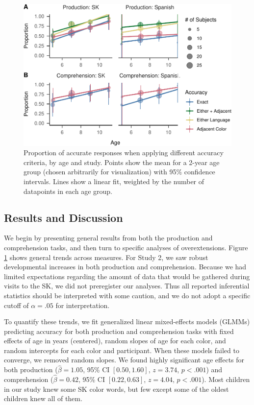 \documentclass[
  english,
  ,man,floatsintext]{apa6}
\begin{document}
\begin{figure}
\centering
\includegraphics{amazon_color_files/figure-latex/study23-accuracy-1.pdf}
\caption{\label{fig:study23-accuracy}Proportion of accurate responses when applying different accuracy criteria, by age and study. Points show the mean for a 2-year age group (chosen arbitrarily for visualization) with 95\% confidence intervals. Lines show a linear fit, weighted by the number of datapoints in each age group.}
\end{figure}

\hypertarget{results-and-discussion-1}{%
\subsection{Results and Discussion}\label{results-and-discussion-1}}

We begin by presenting general results from both the production and comprehension tasks, and then turn to specific analyses of overextensions. Figure \ref{fig:study23-accuracy} shows general trends across measures. For Study 2, we saw robust developmental increases in both production and comprehension. Because we had limited expectations regarding the amount of data that would be gathered during visits to the SK, we did not preregister our analyses. Thus all reported inferential statistics should be interpreted with some caution, and we do not adopt a specific cutoff of \(\alpha = .05\) for interpretation.

To quantify these trends, we fit generalized linear mixed-effects models (GLMMs) predicting accuracy for both production and comprehension tasks with fixed effects of age in years (centered), random slopes of age for each color, and random intercepts for each color and participant. When these models failed to converge, we removed random slopes. We found highly significant age effects for both production (\(\hat{\beta} = 1.05\), 95\% CI \([0.50, 1.60]\), \(z = 3.74\), \(p < .001\)) and comprehension (\(\hat{\beta} = 0.42\), 95\% CI \([0.22, 0.63]\), \(z = 4.04\), \(p < .001\)). Most children in our study knew some SK color words, but few except some of the oldest children knew all of them.
\end{document}
